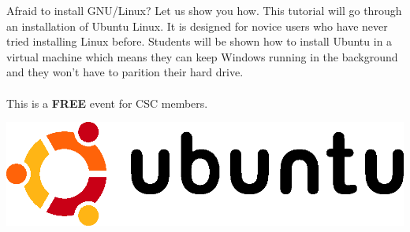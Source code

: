 \documentclass{article}
\begin{document}


Afraid to install GNU/Linux? Let us show you how. This tutorial will go through an installation of Ubuntu Linux. It is designed for novice users who have never tried installing Linux before. Students will be shown how to install Ubuntu in a virtual machine which means they can keep Windows running in the background and they won't have to parition their hard drive.\\ \\
This is a \textbf{FREE} event for CSC members.


\begin{center}
\includegraphics{UbuntuLogo.eps}
\end{center}
\end{document}
